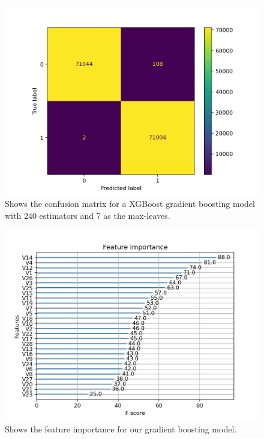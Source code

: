 \documentclass{article}
\begin{document}
\begin{figure}
	\centering
	\includegraphics[scale=0.8]{xgb_final_confusion_mat}
	\caption{Shows the confusion matrix for a XGBoost gradient boosting
		model with $240$ estimators and $7$ as the max-leaves.}
	\label{xgbconfusionmat}
\end{figure}
\begin{figure}
	\centering
	\includegraphics[scale=0.8]{xgb_final_importance}
	\caption{Shows the feature importance for our gradient boosting model.}
	\label{xgbimportance}
\end{figure}
\end{document}

